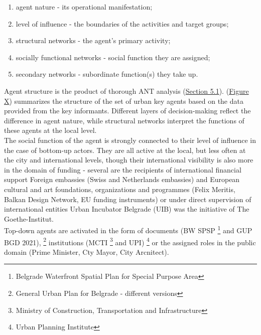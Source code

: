 \documentclass[11pt]{report}
\begin{document}
\begin{enumerate}
\item agent nature - its operational manifestation;
\item level of influence - the boundaries of the activities and target groups;
\item structural networks - the agent’s primary activity;
\item socially functional networks - social function they are assigned;
\item secondary networks - subordinate function(s) they take up.
\end{enumerate}

Agent structure is the product of thorough ANT analysis (\href{Section 5.1}{Section 5.1}). 
(\href{FigureX}{Figure X})
summarizes the structure of the set of urban key agents based on the data provided from the key informants.
Different layers of decision-making reflect the difference in agent nature, while structural networks interpret the functions of these agents at the local level.
\\

The social function of the agent is strongly connected to their level of influence in the case of bottom-up actors. They are all active at the local, but less often at the city and international levels, though their international visibility is also more in the domain of funding - several are the recipients of international financial support {Foreign embassies (Swiss and Netherlands embassies) and European cultural and art foundations, organizations and programmes (Felix Meritis, Balkan Design Network, EU funding instruments)} or under direct supervision of international entities {Urban Incubator Belgrade (UIB) was the initiative of The Goethe-Institut}.
\\

Top-down agents are activated in the form of documents (BW SPSP
\footnote{Belgrade Waterfront Spatial Plan for Special Purpose Area}
and GUP BGD 2021),
\footnote{General Urban Plan for Belgrade - different versions}
institutions (MCTI
\footnote{Ministry of Construction, Transportation and Infrastructure}
and UPI)
\footnote{Urban Planning Institute}
or the assigned roles in the public domain (Prime Minister, Cty Mayor, City Arcnitect).
\\
\end{document}
